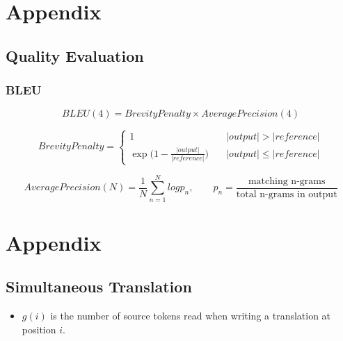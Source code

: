 \documentclass[landscape]{article}
\begin{document}
\cp
\thispagestyle{empty}
\section*{Appendix}
\vspace*{10mm}
\subsection*{Quality Evaluation}
\vspace*{5mm}
\subsubsection*{BLEU}
\begin{equation}\nonumber
	BLEU(4) = BrevityPenalty \times AveragePrecision(4) 
\end{equation}

\begin{equation}\nonumber
	BrevityPenalty = \left\{
		 \begin{array}{ll}
		 	1 & \quad |output| > |reference|	\\
		 	\exp\bigg (1 - \frac{|output|}{|reference|}\bigg) & \quad |output| \leq |reference|
   		 \end{array}
    \right.	
\end{equation}

\begin{equation}\nonumber
	AveragePrecision(N) = \frac{1}{N} \sum_{n=1}^N log p_n, \qquad 	p_n = \frac{\mbox{matching n-grams}}{\mbox{total n-grams in output}}
\end{equation}

\cp
\thispagestyle{empty}
\section*{Appendix}
\vspace*{10mm}
\subsection*{Simultaneous Translation}
\vspace*{5mm}
\begin{itemize}
	\item $g(i)$ is the number of source tokens read when writing a translation at position $i$.
\end{itemize}
\end{document}

